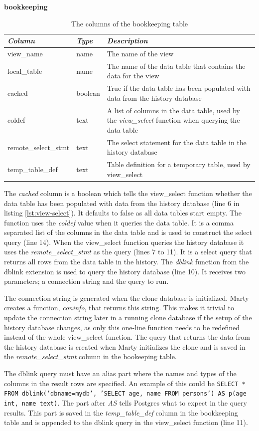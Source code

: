 \begin{table}[h]
  \centering
  \textbf{bookkeeping}
  \begin{tabularx}{\textwidth}{llX}
    \textit{Column} & \textit{Type} & \textit{Description} \\
    \midrule
    view\_name & name & The name of the view \\
    local\_table & name & The name of the data table that contains the data for the view \\
    cached & boolean & True if the data table has been populated with data from the history database \\
    coldef & text & A list of columns in the data table, used by the \textit{view\_select} function when querying the data table \\
    remote\_select\_stmt & text & The select statement for the data table in the history database \\
    temp\_table\_def & text & Table definition for a temporary table, used by view\_select \\
  \end{tabularx}
  \caption{The columns of the bookkeeping table}
  \label{tbl:bookkeeping}
\end{table}

The \textit{cached} column is a boolean which tells the view\_select function whether the data table has been populated with data from the history database (line 6 in listing \ref{lst:view-select}).
It defaults to false as all data tables start empty.
The function uses the \textit{coldef} value when it queries the data table.
It is a comma separated list of the columns in the data table and is used to construct the select query (line 14).
When the view\_select function queries the history database it uses the \textit{remote\_select\_stmt} as the query (lines 7 to 11).
It is a select query that returns all rows from the data table in the history.
The \textit{dblink} function from the dblink extension is used to query the history database (line 10).
It receives two parameters; a connection string and the query to run.

The connection string is generated when the clone database is initialized.
Marty creates a function, \textit{coninfo}, that returns this string.
This makes it trivial to update the connection string later in a running clone database if the setup of the history database changes, as only this one-line function needs to be redefined instead of the whole view\_select function.
The query that returns the data from the history database is created when Marty initializes the clone and is saved in the \textit{remote\_select\_stmt} column in the bookeeping table.

The dblink query must have an alias part where the names and types of the columns in the result rows are specified.
An example of this could be \texttt{SELECT * FROM dblink('dbname=mydb', 'SELECT age, name FROM persons') AS p(age int, name text)}.
The part after \textit{AS} tells Postgres what to expect in the query results.
This part is saved in the \textit{temp\_table\_def} column in the bookkeeping table and is appended to the dblink query in the view\_select function (line 11).